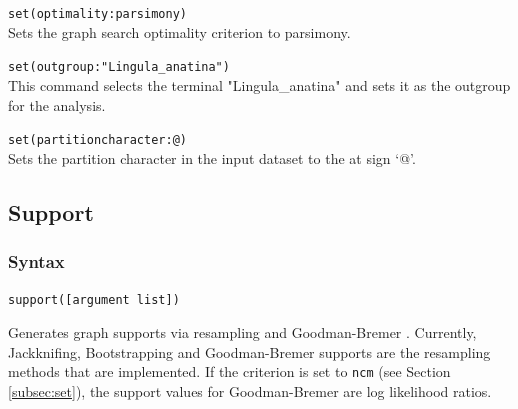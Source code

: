 	\begin{example}
		\item{\texttt{set(optimality:parsimony)}\\Sets the graph search optimality criterion to 
		parsimony.}

		\item{\texttt{set(outgroup:"Lingula\_anatina")}\\This command selects the terminal 
		"Lingula\_anatina" and sets it as the outgroup for the analysis.}
		
		\item{\texttt{set(partitioncharacter:@)}\\Sets the partition character in the input dataset 
		to the at sign `@'.}
		
	\end{example}

\subsection{Support}
\label{subsec:support}
	\subsubsection{Syntax}
		\texttt{support([argument list])}
		
	\begin{phygdescription}
		{Generates graph supports via resampling \citep{Farrisetal1996} and Goodman-Bremer 
		\citep{Goodmanetal1982, bremer1994}. Currently, Jackknifing, Bootstrapping and 
		Goodman-Bremer supports are the resampling methods that are implemented. If
		the criterion is set to \texttt{ncm} (see Section \ref{subsec:set}), the support values 
		for Goodman-Bremer are log likelihood ratios.}
	\end{phygdescription}
		
